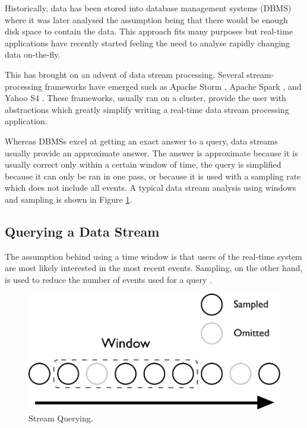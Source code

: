\documentclass[bsc,logo,frontabs,twoside,singlespacing,normalheadings,parskip]{infthesis}\usepackage[]{graphicx}\usepackage[]{color}
\begin{document}
Historically, data has been stored into database management systems (DBMS) where it was later analysed the assumption being that there would be enough disk space to contain the data. This approach fits many purposes but real-time applications have recently started feeling the need to analyse rapidly changing data on-the-fly.

This has brought on an advent of data stream processing. Several stream-processing frameworks have emerged such as Apache Storm \citep{ApacheStorm}, Apache Spark \citep{ApacheSpark}, and Yahoo S4 \citep{YahooS4}. These frameworks, usually ran on a cluster, provide the user with abstractions which greatly simplify writing a real-time data stream processing application.

Whereas DBMSs excel at getting an exact answer to a query, data streams usually provide an approximate answer. The answer is approximate because it is usually correct only within a certain window of time, the query is simplified because it can only be ran in one pass, or because it is used with a sampling rate which does not include all events. A typical data stream analysis using windows and sampling is shown in Figure \ref{fig:stream}.

\subsection{Querying a Data Stream}

The assumption behind using a time window is that users of the real-time system are most likely interested in the most recent events. Sampling, on the other hand, is used to reduce the number of events used for a query \citep{Gaber:2005:MDS:1083784.1083789}.

\begin{figure}[!htb]
	\centering
	\includegraphics[scale=0.5]{pdf/stream.pdf}
	\caption{Stream Querying.}
	\label{fig:stream}
\end{figure}
\end{document}
